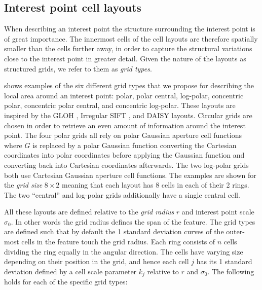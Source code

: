 \documentclass[thesis.tex]{subfiles}
\begin{document}
\subsection{Interest point cell layouts}
\label{sec:cellApertureFunctionPoint}
When describing an interest point the structure surrounding the interest point is of great importance. The innermost cells of the cell layouts are therefore spatially smaller than the cells further away, in order to capture the structural variations close to the interest point in greater detail. Given the nature of the layouts as structured grids, we refer to them as \emph{grid types}.

 shows examples of the six different grid types that we propose for describing the local area around an interest point: polar, polar central, log-polar, concentric polar, concentric polar central, and concentric log-polar. These layouts are inspired by the GLOH \cite{mikolajczyk2005performance}, Irregular SIFT \cite{cui2009scale}, and DAISY \cite{tola2008fast} layouts. Circular grids are chosen in order to retrieve an even amount of information around the interest point. The four polar grids all rely on polar Gaussian aperture cell functions where $G$ is replaced by a polar Gaussian function converting the Cartesian coordinates into polar coordinates before applying the Gaussian function and converting back into Cartesian coordinates afterwards. The two log-polar grids both use Cartesian Gaussian aperture cell functions. The examples are shown for the \emph{grid size} $8\times 2$ meaning that each layout has 8 cells in each of their 2 rings. The two ``central'' and log-polar grids additionally have a single central cell.

All these layouts are defined relative to the \emph{grid radius} $r$ and interest point scale $\sigma_0$. In other words the grid radius defines the span of the feature. The grid types are defined such that by default the 1 standard deviation curves of the outer-most cells in the feature touch the grid radius. Each ring consists of $n$ cells dividing the ring equally in the angular direction. The cells have varying size depending on their position in the grid, and hence each cell $j$ has its 1 standard deviation defined by a cell scale parameter $k_j$ relative to $r$ and $\sigma_0$. The following holds for each of the specific grid types:
\end{document}

